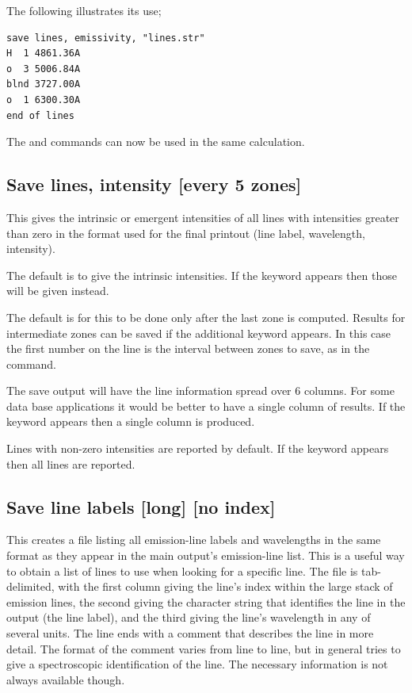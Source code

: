 The following illustrates its use;
\begin{verbatim}
save lines, emissivity, "lines.str"
H  1 4861.36A
o  3 5006.84A
blnd 3727.00A
o  1 6300.30A
end of lines
\end{verbatim}

The  and  commands can now be used in the same calculation.

\subsection{Save lines, intensity [every 5 zones]}

This gives the
intrinsic or emergent intensities of all lines with
intensities greater than zero in the format used for the final printout
(line label, wavelength, intensity).

The default is to give the intrinsic intensities.
If the keyword  appears then
those will be given instead.

The default is for this to be done
only after the last zone is computed.  Results for intermediate zones can
be saved if the additional keyword  appears.
In this case the first
number on the line is the interval between zones to save,
as in the  command.

The save output will have the line information spread over 6 columns.
For some data base applications it would be better to have a single column
of results.  If the keyword  appears then a single column is produced.

Lines with non-zero intensities are reported by default.  
If the keyword  appears then all lines are reported.

\subsection{Save line labels [long] [no index]}
\label{sec:SaveLineLabels}

This creates a file listing all emission-line labels and wavelengths
in the same format as they appear in the main output's emission-line list.
This is a useful way to obtain a list of lines to use when looking for a
specific line.  The file is tab-delimited, with the first column giving
the line's index within the large stack of emission lines, the second giving
the character string that identifies the line in the output (the line label), and the third giving
the line's wavelength in any of several units.  The line ends with a
comment that describes the line in more detail.  The format of the comment
varies from line to line, but in general tries to give a spectroscopic
identification of the line. The necessary information is not always available though.

